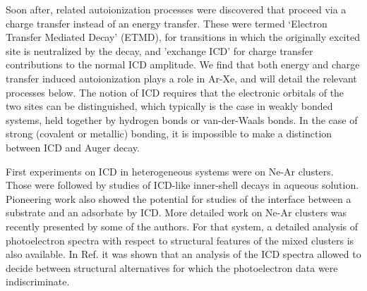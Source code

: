 Soon after, related 
autoionization processes were discovered that proceed via a 
charge transfer instead of an energy transfer. 
These were termed `Electron Transfer Mediated Decay' 
 (ETMD),\cite{zobeley,mueller,sakai,foerstel} for transitions in 
 which the originally excited site is neutralized by the decay, 
 and 'exchange ICD' for charge transfer contributions to the 
 normal ICD amplitude.\cite{santrarev,jahnkesat}
We find that both energy and charge transfer induced 
autoionization plays a role in Ar-Xe, and will detail the 
relevant processes below. The notion of ICD requires that the 
electronic orbitals of the two sites can be distinguished, which 
typically is the case in weakly bonded systems, held together by 
hydrogen bonds or van-der-Waals bonds. In the case of strong
(covalent or metallic) bonding, it is impossible to make a
distinction between ICD and Auger decay.\cite{hergenhahn_review}

First experiments on ICD in heterogeneous systems were on Ne-Ar 
clusters.\cite{barthnear} Those were followed by studies of 
ICD-like inner-shell decays in aqueous solution.\cite{aziz,pokapanich,pokapanich2011}
Pioneering work also showed the 
potential for studies of the interface between a substrate and an 
adsorbate by ICD.\cite{grieves} More detailed work on Ne-Ar 
clusters was recently presented by some of the authors.\cite{
fasshauer2014} For that system, a detailed analysis of 
photoelectron spectra with respect to structural features of the 
mixed clusters is also available.\cite{lundwall} In Ref.  it was shown that an analysis of the ICD spectra 
allowed to decide between structural alternatives for which the 
photoelectron data were indiscriminate.

